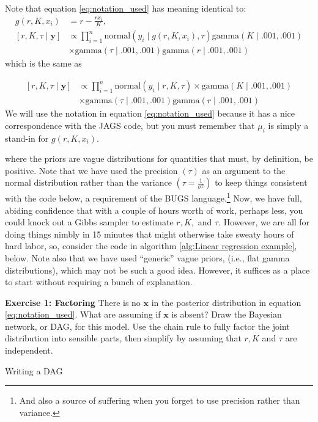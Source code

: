 \documentclass[12pt,english]{article}
\begin{document}
\begin{tcolorbox}

Note that equation \ref{eq:notation_used} has meaning identical to:
\begin{align}
g(r,K,x_i)& =  r-\frac{rx_{i}}{K}\textrm{,}\\
\left[r,K,\tau\mid\mathbf{y}\right]  &\propto  \prod_{i=1}^{n}\textrm{normal}\left(y_{i}\mid g(r,K,x_i),\tau\right) \textrm{gamma}\left(K\mid.001,.001\right) \nonumber \\ 
& \times \textrm{gamma}\left(\tau\mid.001,.001\right)\textrm{gamma}\left(r\mid.001,.001\right)\nonumber
\end{align}
which is the same as 

\begin{align}
\left[r,K,\tau\mid\mathbf{y}\right]  &\propto  \prod_{i=1}^{n}\textrm{normal}\left(y_{i}\mid r,K,\tau\right)\times\label{eq:conditional} \textrm{gamma}\left(K\mid.001,.001\right) \nonumber \\
 &\times \textrm{gamma}\left(\tau\mid.001,.001\right)\textrm{gamma}\left(r\mid.001,.001\right) \nonumber
\end{align}
We will use the notation in equation  \ref{eq:notation_used} because it has a nice correspondence with the JAGS code, but you must remember that $\mu_i$ is simply a stand-in for $g(r,K,x_i)$.


\end{tcolorbox}


\noindent where the priors are vague distributions for quantities that must, by definition, be positive. Note that we have used the precision $(\tau)$ as an argument to the normal distribution rather than the variance $\left(\tau=\frac{1}{\sigma^{2}}\right)$ to keep things consistent with the code below, a requirement of the BUGS language.\footnote{And also a source of suffering when you forget to use precision rather than variance.} Now, we have full, abiding confidence that with a couple of hours worth of work, perhaps less, you could knock out a Gibbs sampler to estimate $r,K,$ and $\tau$. However, we are all for doing things nimbly in 15 minutes that might otherwise take  sweaty hours of hard labor, so, consider the code in algorithm \ref{alg:Linear regression example}, below. Note also that we have used \enquote{generic} vague priors, (i.e., flat gamma distributions), which may not be such a good idea. However, it suffices as a place to start without requiring a bunch of explanation.

\bigskip
\belowcaptionskip=-40pt
\begin{exercise}
\begin{mdframed}
\doublespacing
\textbf{Exercise 1:  Factoring} There is no $\mathbf{x}$ in the posterior distribution in equation \ref{eq:notation_used}. What are assuming if $\mathbf{x}$ is absent? Draw the Bayesian network, or DAG, for this model. Use the chain rule to fully factor the joint distribution into sensible parts, then simplify by assuming that $r,K$ and $\tau$ are independent.
\end{mdframed}
\captionsetup{textformat=empty, labelformat=empty}
\caption{Writing a DAG}
\label{ex:DAG}
\end{exercise}
\belowcaptionskip=0pt
\end{document}
